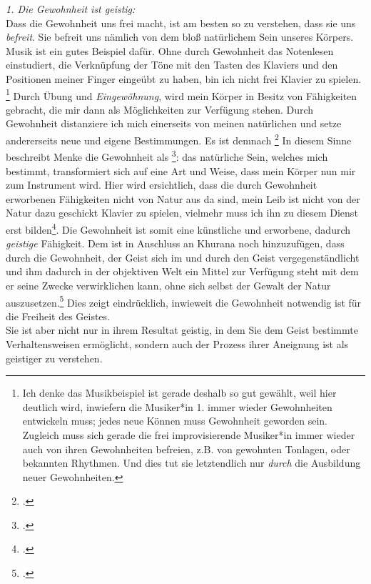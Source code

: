 \documentclass[12pt, a4paper, openany]{report}
\begin{document}
\emph{1. Die Gewohnheit ist geistig:}\\
Dass die Gewohnheit uns frei macht, ist am besten so zu verstehen, dass sie uns \emph{befreit}. 
Sie befreit uns nämlich von dem bloß natürlichem Sein unseres Körpers.
Musik ist ein gutes Beispiel dafür. 
Ohne durch Gewohnheit das Notenlesen einstudiert, die Verknüpfung der Töne mit den Tasten des Klaviers und den Positionen meiner Finger eingeübt zu haben, bin ich nicht frei Klavier zu spielen.%
\footnote{
    Ich denke das Musikbeispiel ist gerade deshalb so gut gewählt, weil hier deutlich wird, inwiefern die Musiker*in 1. immer wieder Gewohnheiten entwickeln muss; jedes neue Können muss Gewohnheit geworden sein.
     Zugleich muss sich gerade die frei improvisierende Musiker*in immer wieder auch von ihren Gewohnheiten befreien, z.B. von gewohnten Tonlagen, oder bekannten Rhythmen. 
    Und dies tut sie letztendlich nur \emph{durch} die Ausbildung neuer Gewohnheiten.
}
Durch Übung und \emph{Eingewöhnung}, wird mein Körper in Besitz von Fähigkeiten gebracht, die mir dann als Möglichkeiten zur Verfügung stehen.
Durch Gewohnheit distanziere ich mich einerseits von meinen natürlichen und setze andererseits neue und eigene Bestimmungen. 
Es ist demnach \footcite[][§410 (Anmerkung), S. 185]{hegel_enzyklopädie_1969}
In diesem Sinne beschreibt Menke die Gewohnheit als \footcite[][130]{menke_autonomie_2018}:
das natürliche Sein, welches mich bestimmt, transformiert sich auf eine Art und Weise, dass mein Körper nun mir zum Instrument wird.
Hier wird ersichtlich, dass die durch Gewohnheit erworbenen Fähigkeiten nicht von Natur aus da sind, mein Leib ist nicht von der Natur dazu geschickt Klavier zu spielen, vielmehr muss ich ihn zu diesem Dienst erst bilden\footcite[Vgl.][§410 Zusatz, S. 190]{hegel_enzyklopädie_1969}. 
Die Gewohnheit ist somit eine künstliche und erworbene, dadurch \emph{geistige} Fähigkeit.
Dem ist in Anschluss an Khurana noch hinzuzufügen, dass durch die Gewohnheit, der Geist sich im und durch den Geist vergegenständlicht und ihm dadurch in der objektiven Welt ein Mittel zur Verfügung steht mit dem er seine Zwecke verwirklichen kann, ohne sich selbst der Gewalt der Natur auszusetzen.\footcite[Vgl.][426]{khurana_freiheit_2017}
Dies zeigt eindrücklich, inwieweit die Gewohnheit notwendig ist für die Freiheit des Geistes.\\
Sie ist aber nicht nur in ihrem Resultat geistig, in dem Sie dem Geist bestimmte Verhaltensweisen ermöglicht, sondern auch der Prozess ihrer Aneignung ist als geistiger zu verstehen.
\end{document}
